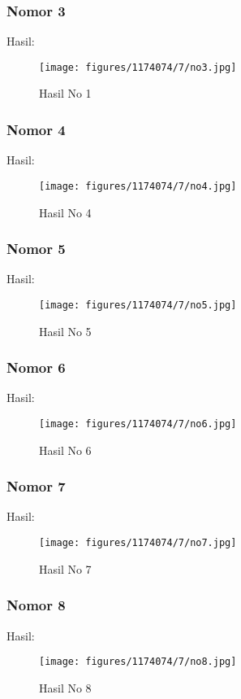 \subsubsection{Nomor 3}
\hfill\break

Hasil:
\begin{figure}[H]
\centering
	\texttt{[image: figures/1174074/7/no3.jpg]}
	\caption{Hasil No 1}
\end{figure}

\subsubsection{Nomor 4}
\hfill\break

Hasil:
\begin{figure}[H]
\centering
	\texttt{[image: figures/1174074/7/no4.jpg]}
	\caption{Hasil No 4}
\end{figure}

\subsubsection{Nomor 5}
\hfill\break

Hasil:
\begin{figure}[H]
\centering
	\texttt{[image: figures/1174074/7/no5.jpg]}
	\caption{Hasil No 5}
\end{figure}

\subsubsection{Nomor 6}
\hfill\break

Hasil:
\begin{figure}[H]
\centering
	\texttt{[image: figures/1174074/7/no6.jpg]}
	\caption{Hasil No 6}
\end{figure}

\subsubsection{Nomor 7}
\hfill\break

Hasil:
\begin{figure}[H]
\centering
	\texttt{[image: figures/1174074/7/no7.jpg]}
	\caption{Hasil No 7}
\end{figure}

\subsubsection{Nomor 8}
\hfill\break

Hasil:
\begin{figure}[H]
\centering
	\texttt{[image: figures/1174074/7/no8.jpg]}
	\caption{Hasil No 8}
\end{figure}

